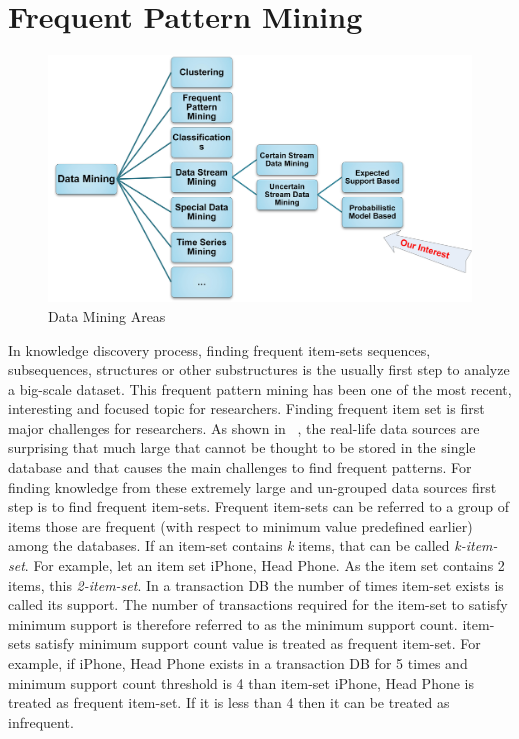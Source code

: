 \section{Frequent Pattern Mining}
\begin{figure}
\centering
  \includegraphics[width=.9\textwidth]{images/mining_class.jpg}
\caption{Data Mining Areas}
\label{figure:mining_class}
\end{figure}
In knowledge discovery process, finding frequent item-sets sequences, subsequences, structures or other substructures is the usually first step to analyze a big-scale dataset. This frequent pattern mining has been one of the most recent, interesting and focused topic for researchers. Finding frequent item set is first major challenges for researchers. As shown in ~\cite{apriori}, the real-life data sources are surprising that much large that cannot be thought to be stored in the single database and that causes the main challenges to find frequent patterns. For finding knowledge from these extremely large and un-grouped data sources first step is to find frequent item-sets. Frequent item-sets can be referred to a group of items those are frequent (with respect to minimum value predefined earlier) among the databases. If an item-set contains \emph{k} items, that can be called \emph{k-item-set}. For example, let an item set {iPhone, Head Phone}. As the item set contains 2 items, this \emph{2-item-set}. In a transaction DB the number of times item-set exists is called its support. The number of transactions required for the item-set to satisfy minimum support is therefore referred to as the minimum support count. item-sets satisfy minimum support count value is treated as frequent item-set. For example, if {iPhone, Head Phone} exists in a transaction DB for 5 times and minimum support count threshold is 4 than item-set {iPhone, Head Phone} is treated as frequent item-set. If it is less than 4 then it can be treated as infrequent.\\
